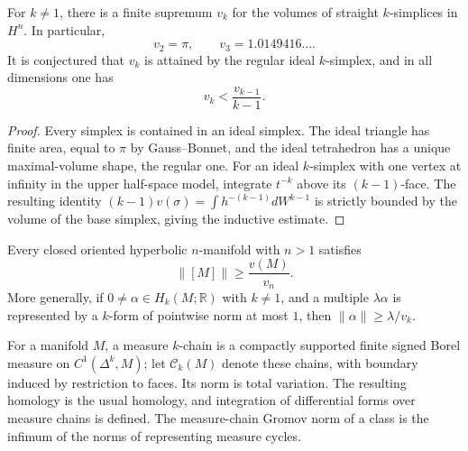 \begin{proposition}
\label{thurston-ch06-simplex-volume-bound}

For $k\neq1$, there is a finite supremum $v_k$ for the volumes of straight $k$-simplices in $H^n$. In particular,
\[
v_2=\pi,\qquad v_3=1.0149416\ldots.
\]
It is conjectured that $v_k$ is attained by the regular ideal $k$-simplex, and in all dimensions one has
\[
v_k<\frac{v_{k-1}}{k-1}.
\]
\end{proposition}

\begin{proof}
\sketch
Every simplex is contained in an ideal simplex. The ideal triangle has finite area, equal to $\pi$ by Gauss--Bonnet, and the ideal tetrahedron has a unique maximal-volume shape, the regular one. For an ideal $k$-simplex with one vertex at infinity in the upper half-space model, integrate $t^{-k}$ above its $(k-1)$-face. The resulting identity $(k-1)v(\sigma)=\int h^{-(k-1)}dW^{k-1}$ is strictly bounded by the volume of the base simplex, giving the inductive estimate.
\end{proof}

\begin{corollary}
\label{thurston-ch06-hyperbolic-norm-lower-bound}

Every closed oriented hyperbolic $n$-manifold with $n>1$ satisfies
\[
\|[M]\|\geq\frac{v(M)}{v_n}.
\]
More generally, if $0\neq\alpha\in H_k(M;\mathbb R)$ with $k\neq1$, and a multiple $\lambda\alpha$ is represented by a $k$-form of pointwise norm at most $1$, then $\|\alpha\|\geq\lambda/v_k$.
\end{corollary}

\begin{definition}
\label{thurston-ch06-measure-chains}

For a manifold $M$, a measure $k$-chain is a compactly supported finite signed Borel measure on $C^1(\Delta^k,M)$; let $\mathcal C_k(M)$ denote these chains, with boundary induced by restriction to faces. Its norm is total variation. The resulting homology is the usual homology, and integration of differential forms over measure chains is defined. The measure-chain Gromov norm of a class is the infimum of the norms of representing measure cycles.
\end{definition}

